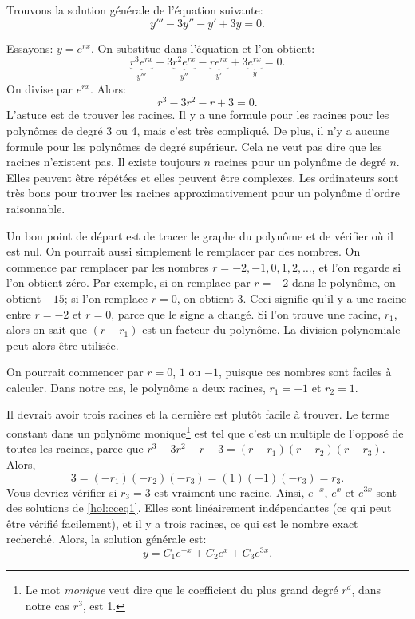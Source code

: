 \begin{example}
	Trouvons la solution générale de l'équation suivante:
	\begin{equation} \label{hol:cceq1}
		y''' - 3 y'' - y' + 3y = 0 .
	\end{equation}
	
	Essayons: $y = e^{rx}$. On substitue dans l'équation et l'on obtient:
	\begin{equation*}
		\underbrace{r^3 e^{rx}}_{y'''} - 3 \underbrace{r^2 e^{rx}}_{y''} -
		\underbrace{r e^{rx}}_{y'} + 3 \underbrace{e^{rx}}_{y} = 0 .
	\end{equation*}
	On divise par $e^{rx}$.  Alors: 
	\begin{equation*}
		r^3 - 3 r^2 - r + 3 = 0 .
	\end{equation*}
	L'astuce est de trouver les racines. Il y a une formule pour les racines pour les polynômes de degré 3 ou 4, mais c'est très compliqué. De plus, il n'y a aucune formule pour les polynômes de degré supérieur. Cela ne veut pas dire que les racines n'existent pas. Il existe toujours 
	$n$ racines pour un polynôme de degré  $n$.  Elles peuvent être répétées 
	et elles peuvent être complexes. Les ordinateurs sont très bons pour trouver les racines approximativement pour un polynôme d'ordre  raisonnable.
	
	Un bon point de départ est de tracer le graphe du polynôme et de vérifier où il est nul.
	On pourrait aussi simplement le remplacer par des nombres. 
	On commence par remplacer par les nombres  $r=-2, -1, 0, 1, 2, \ldots$, et l'on regarde si l'on obtient zéro. 
	Par exemple, si on remplace par $r=-2$ dans le polynôme, on obtient $-15$; si l'on remplace $r=0$, on obtient 3.
	Ceci signifie qu'il y a une racine entre $r=-2$ et $r=0$,
	parce que le signe a changé.
	Si l'on trouve une racine, $r_1$, alors on sait que $(r-r_1)$ est un facteur du polynôme. La division polynomiale peut alors être utilisée. 
	
	On pourrait commencer par $r=0$, $1$ ou $-1$, puisque ces nombres sont faciles à calculer. Dans notre cas, le polynôme a deux racines,  $r_1 = -1$
	et $r_2 = 1$.  
	
	Il devrait avoir trois racines et la dernière est plutôt facile à trouver. Le terme constant dans un polynôme monique\footnote{Le mot \emph{monique} veut dire que le coefficient du plus grand degré $r^d$, dans notre cas $r^3$, est 1.}
	est tel que c'est un multiple de l'opposé de toutes les racines, parce que 
	$r^3 - 3 r^2 - r + 3 = (r-r_1)(r-r_2)(r-r_3)$.
	Alors,
	\begin{equation*}
		3 = (-r_1)(-r_2)(-r_3) = (1)(-1)(-r_3) = r_3 .
	\end{equation*}
	Vous devriez vérifier si  $r_3 = 3$ est vraiment une racine.  
	Ainsi, $e^{-x}$, $e^{x}$
	et $e^{3x}$ sont des solutions de \eqref{hol:cceq1}.  
	Elles sont linéairement indépendantes (ce qui peut être vérifié facilement), et il y a trois racines, 
	ce qui est le nombre exact recherché. 
	Alors, la solution générale est: 
	\begin{equation*}
		y = C_1 e^{-x} + C_2 e^{x} + C_3 e^{3x} .
	\end{equation*}
	

\end{example}
